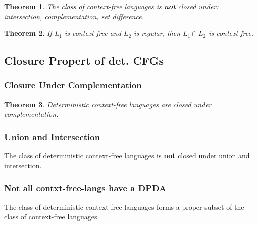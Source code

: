 \documentclass[a3paper, 8pt]{extarticle}
\newtheorem{theorem}{Theorem}[section]
\begin{document}
\begin{multicols*}{6}
\begin{theorem}
The class of context-free languages is \textbf{not} closed under: intersection, complementation, set difference.
\end{theorem}

\begin{theorem}
If $L_1$ is context-free and $L_2$ is regular, then $L_1 \cap L_2$ is context-free.
\end{theorem}

\subsection{Closure Propert of det.  CFGs}

\subsubsection{Closure Under Complementation}

\begin{theorem}
Deterministic context-free languages are closed under complementation.
\end{theorem}


\subsubsection{Union and Intersection}
The class of deterministic context-free languages is \textbf{not} closed under
union and intersection.

\subsubsection{Not all contxt-free-langs have a DPDA}
The class of deterministic context-free languages forms a proper subset of the class of context-free languages.


\end{multicols*}
\end{document}
